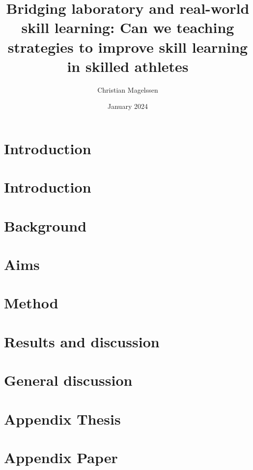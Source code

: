 \documentclass{report}
\title{Bridging laboratory and real-world skill learning: Can we teaching strategies to improve skill learning in skilled athletes}
\author{Christian Magelssen}
\date{January 2024}
\begin{document}
\newcommand{\RNum}[1]{\uppercase\expandafter{\romannumeral #1\relax}}


\maketitle

\tableofcontents 
\listoffigures


\chapter{Introduction}




\chapter{Introduction}


\chapter{Background}


\chapter{Aims}



\chapter{Method}



\chapter{Results and discussion}


\chapter{General discussion}


\chapter{Appendix Thesis}



\chapter{Appendix Paper \RNum{1}}





\printbibliography
\end{document}
